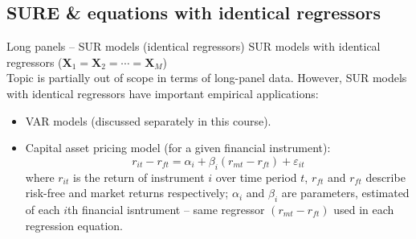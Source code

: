 \documentclass[usenames,dvipsnames]{beamer}
\begin{document}
\subsection*{SURE \& equations with identical regressors}
\begin{frame}{Long panels -- SUR models (identical regressors)}
\small
SUR models with identical regressors ($\bm{X}_1=\bm{X}_2=\cdots=\bm{X}_M$)\\ \bigskip
Topic is partially out of scope in terms of long-panel data. However, SUR models with identical regressors have important empirical applications: \\ \bigskip
\begin{itemize}
    \item VAR models (discussed separately in this course).
    \bigskip
    \item Capital asset pricing model (for a given financial instrument):
    $$
    r_{it} - r_{ft} = \alpha_i + \beta_i (r_{mt} - r_{ft}) + \varepsilon_{it}
    $$
    where $r_{it}$ is the return of instrument $i$ over time period $t$, $r_{ft}$ and $r_{ft}$ describe risk-free and market returns respectively; $\alpha_i$ and $\beta_i$ are parameters, estimated of each $i$th financial isntrument -- same regressor $(r_{mt} - r_{ft})$ used in each regression equation.
\end{itemize}
\end{frame}
\end{document}
